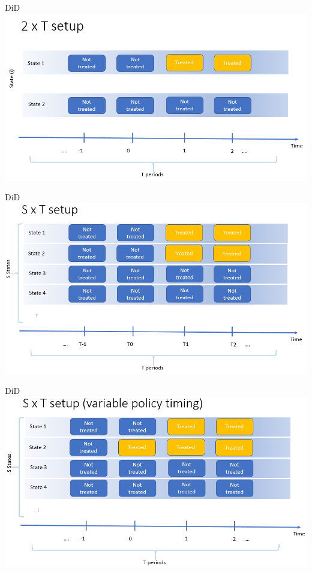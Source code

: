 \documentclass[
  ignorenonframetext,
]{beamer}
\begin{document}
\begin{frame}{DiD}
\protect\hypertarget{did-2}{}
\includegraphics{2xTslide1.PNG}
\end{frame}

\begin{frame}{DiD}
\protect\hypertarget{did-3}{}
\includegraphics{2xTslide2.PNG}
\end{frame}

\begin{frame}{DiD}
\protect\hypertarget{did-4}{}
\includegraphics{2xTslide3.PNG}
\end{frame}
\end{document}
